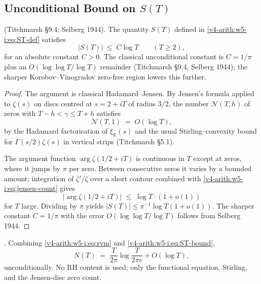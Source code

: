 \subsection{Unconditional Bound on \(S(T)\)}
\label{v4-arith:w5-i:ST-bound}

\begin{theorem}
\label{v4-arith:w5-i:thm:ST-bound}
\ClaimStatusProvedElsewhere (Titchmarsh \S9.4; Selberg 1944). The quantity \(S(T)\) defined in
\eqref{v4-arith:w5-i:eq:ST-def} satisfies
\begin{equation}
\label{v4-arith:w5-i:eq:ST-bound}
|S(T)|\;\leq\;C\log T\qquad(T\geq 2),
\end{equation}
for an absolute constant \(C>0\). The classical unconditional constant
is \(C=1/\pi\) plus an \(O(\log\log T/\log T)\) remainder
(Titchmarsh \S9.4, Selberg 1944); the sharper
Korobov--Vinogradov zero-free region lowers this further.
\end{theorem}

\begin{proof}
The argument is classical Hadamard--Jensen. By Jensen's formula
applied to \(\zeta(s)\) on discs centred at \(s=2+iT\) of radius
\(3/2\), the number \(\mathcal{N}(T,h)\) of zeros with
\(T-h<\gamma\leq T+h\) satisfies
\begin{equation}
\label{v4-arith:w5-i:eq:jensen-count}
\mathcal{N}(T,1)\;=\;O(\log T),
\end{equation}
by the Hadamard factorisation of
\(\xi_{\mathbb R}(s)\) and the usual Stirling--convexity bound for
\(\Gamma(s/2)\zeta(s)\) in vertical strips (Titchmarsh \S5.1).

The argument function \(\arg\zeta(1/2+iT)\) is continuous in \(T\) except
at zeros, where it jumps by \(\pi\) per zero. Between consecutive zeros
it varies by a bounded amount; integration of
\(\zeta'/\zeta\) over a short contour combined with
\eqref{v4-arith:w5-i:eq:jensen-count} gives
\[
|\arg\zeta(1/2+iT)|\;\leq\;\log T\cdot(1+o(1))
\]
for \(T\) large. Dividing by \(\pi\) yields
\(|S(T)|\leq \pi^{-1}\log T(1+o(1))\). The sharper constant \(C=1/\pi\)
with the error \(O(\log\log T/\log T)\) follows from Selberg 1944.
\end{proof}

\begin{corollary}
\label{v4-arith:w5-i:cor:NT-sharp}
\ClaimStatusProvedHere. Combining \eqref{v4-arith:w5-i:eq:rvm} and
\eqref{v4-arith:w5-i:eq:ST-bound},
\begin{equation}
\label{v4-arith:w5-i:eq:NT-main-error}
N(T)\;=\;\frac{T}{2\pi}\log\!\frac{T}{2\pi e}+O(\log T),
\end{equation}
unconditionally. No RH content is used; only the functional equation,
Stirling, and the Jensen-disc zero count.
\end{corollary}

